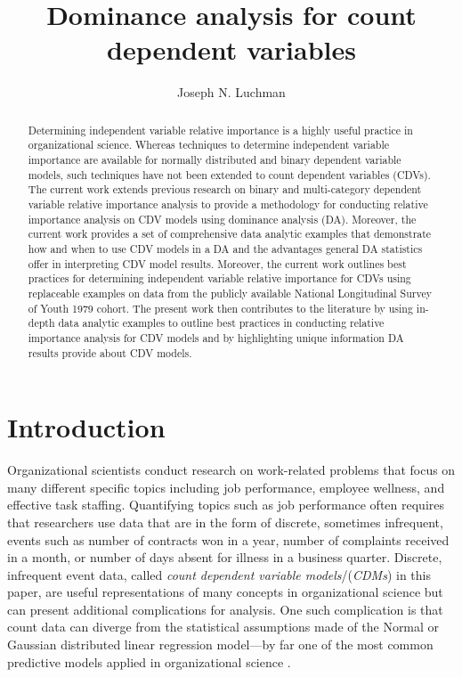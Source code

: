 \documentclass[ShortAfour,times,sageapa]{sagej}
\begin{document}
	
\title{Dominance analysis for count dependent variables}
\author{Joseph N. Luchman}

\begin{abstract}
	Determining independent variable relative importance is a highly useful practice in organizational science.  Whereas techniques to determine independent variable importance are available for normally distributed and binary dependent variable models, such techniques have not been extended to count dependent variables (CDVs).  The current work extends previous research on binary and multi-category dependent variable relative importance analysis to provide a methodology for conducting relative importance analysis on CDV models using dominance analysis (DA).  Moreover, the current work provides a set of comprehensive data analytic examples that demonstrate how and when to use CDV models in a DA and the advantages general DA statistics offer in interpreting CDV model results.  Moreover, the current work outlines best practices for determining independent variable relative importance for CDVs using replaceable examples on data from the publicly available National Longitudinal Survey of Youth 1979 cohort.  The present work then contributes to the literature by using in-depth data analytic examples to outline best practices in conducting relative importance analysis for CDV models and by highlighting unique information DA results provide about CDV models.
\end{abstract}


\maketitle

\section{Introduction}

	Organizational scientists conduct research on work-related problems that focus on many different specific topics including job performance, employee wellness, and effective task staffing.  
	Quantifying topics such as job performance often requires that researchers use data that are in the form of discrete, sometimes infrequent, events such as number of contracts won in a year, number of complaints received in a month, or number of days absent for illness in a business quarter. %
	Discrete, infrequent event data, called \textit{count dependent variable models}/(\textit{CDMs}) in this paper, are useful representations of many concepts in organizational science but can present additional complications for analysis.
	One such complication is that count data can diverge from the statistical assumptions made of the Normal or Gaussian distributed linear regression model---by far one of the most common predictive models applied in organizational science \cite{}.
	
\end{document}
